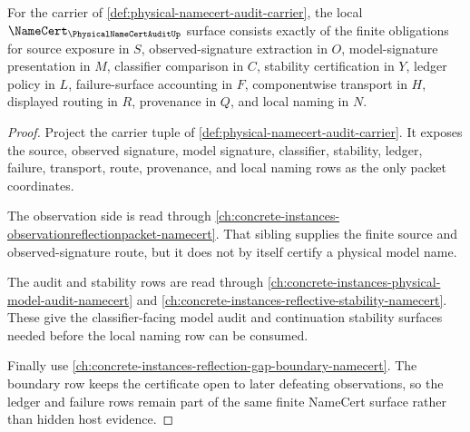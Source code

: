 \begin{theorem}
\label{thm:physical-namecert-audit-obligation-surface}
For the carrier of \autoref{def:physical-namecert-audit-carrier}, the local $\NameCert_{\PhysicalNameCertAuditUp}$ surface consists exactly of the finite obligations for source exposure in $S$, observed-signature extraction in $O$, model-signature presentation in $M$, classifier comparison in $C$, stability certification in $Y$, ledger policy in $L$, failure-surface accounting in $F$, componentwise transport in $H$, displayed routing in $R$, provenance in $Q$, and local naming in $N$.
\end{theorem}
\begin{proof}
Project the carrier tuple of \autoref{def:physical-namecert-audit-carrier}. It exposes the source, observed signature, model signature, classifier, stability, ledger, failure, transport, route, provenance, and local naming rows as the only packet coordinates.

The observation side is read through \autoref{ch:concrete-instances-observationreflectionpacket-namecert}. That sibling supplies the finite source and observed-signature route, but it does not by itself certify a physical model name.

The audit and stability rows are read through \autoref{ch:concrete-instances-physical-model-audit-namecert} and \autoref{ch:concrete-instances-reflective-stability-namecert}. These give the classifier-facing model audit and continuation stability surfaces needed before the local naming row can be consumed.

Finally use \autoref{ch:concrete-instances-reflection-gap-boundary-namecert}. The boundary row keeps the certificate open to later defeating observations, so the ledger and failure rows remain part of the same finite NameCert surface rather than hidden host evidence.
\end{proof}

